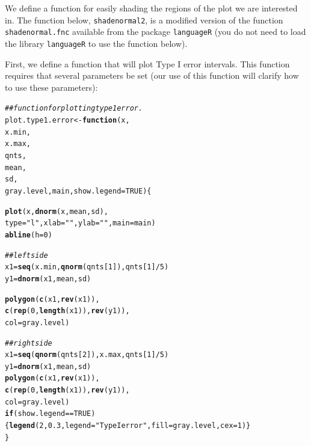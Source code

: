 \documentclass[12pt]{book}\usepackage[]{graphicx}\usepackage[]{color}
\makeatletter
\newcommand{\hlnum}[1]{\textcolor[rgb]{0.686,0.059,0.569}{#1}}%
\newcommand{\hlstr}[1]{\textcolor[rgb]{0.192,0.494,0.8}{#1}}%
\newcommand{\hlcom}[1]{\textcolor[rgb]{0.678,0.584,0.686}{\textit{#1}}}%
\newcommand{\hlopt}[1]{\textcolor[rgb]{0,0,0}{#1}}%
\newcommand{\hlstd}[1]{\textcolor[rgb]{0.345,0.345,0.345}{#1}}%
\newcommand{\hlkwa}[1]{\textcolor[rgb]{0.161,0.373,0.58}{\textbf{#1}}}%
\newcommand{\hlkwb}[1]{\textcolor[rgb]{0.69,0.353,0.396}{#1}}%
\newcommand{\hlkwc}[1]{\textcolor[rgb]{0.333,0.667,0.333}{#1}}%
\newcommand{\hlkwd}[1]{\textcolor[rgb]{0.737,0.353,0.396}{\textbf{#1}}}%
\newenvironment{kframe}{%
 \def\at@end@of@kframe{}%
 \ifinner\ifhmode%
  \def\at@end@of@kframe{\end{minipage}}%
  \begin{minipage}{\columnwidth}%
 \fi\fi%
 \def\FrameCommand##1{\hskip\@totalleftmargin \hskip-\fboxsep
 \colorbox{shadecolor}{##1}\hskip-\fboxsep
     \hskip-\linewidth \hskip-\@totalleftmargin \hskip\columnwidth}%
 \MakeFramed {\advance\hsize-\width
   \@totalleftmargin\z@ \linewidth\hsize
   \@setminipage}}%
 {\par\unskip\endMakeFramed%
 \at@end@of@kframe}
\newenvironment{knitrout}{}{} %
\makeatother
\begin{document}
We define a function for easily shading the regions of the plot we are
interested in. The function below, \texttt{shadenormal2}, is a
modified version of the function \texttt{shadenormal.fnc} available
from the package \texttt{languageR}  (you do not
need to load the library \texttt{languageR} to use the function below). 

First, we define a function that will plot Type I error
intervals. This function requires that several parameters be set (our
use of this function will clarify how to use these parameters):


\begin{knitrout}
\color{fgcolor}\begin{kframe}
\begin{alltt}
\hlcom{## function for plotting type 1 error.}
\hlstd{plot.type1.error}\hlkwb{<-}\hlkwa{function}\hlstd{(}\hlkwc{x}\hlstd{,}
                           \hlkwc{x.min}\hlstd{,}
                           \hlkwc{x.max}\hlstd{,}
                           \hlkwc{qnts}\hlstd{,}
                           \hlkwc{mean}\hlstd{,}
                           \hlkwc{sd}\hlstd{,}
                           \hlkwc{gray.level}\hlstd{,}\hlkwc{main}\hlstd{,}\hlkwc{show.legend}\hlstd{=}\hlnum{TRUE}\hlstd{)\{}

        \hlkwd{plot}\hlstd{(x,}\hlkwd{dnorm}\hlstd{(x,mean,sd),}
                     \hlkwc{type} \hlstd{=} \hlstr{"l"}\hlstd{,}\hlkwc{xlab}\hlstd{=}\hlstr{""}\hlstd{,}\hlkwc{ylab}\hlstd{=}\hlstr{""}\hlstd{,}\hlkwc{main}\hlstd{=main)}
        \hlkwd{abline}\hlstd{(}\hlkwc{h} \hlstd{=} \hlnum{0}\hlstd{)}

\hlcom{## left side    }
    \hlstd{x1} \hlkwb{=} \hlkwd{seq}\hlstd{(x.min,} \hlkwd{qnorm}\hlstd{(qnts[}\hlnum{1}\hlstd{]), qnts[}\hlnum{1}\hlstd{]}\hlopt{/}\hlnum{5}\hlstd{)}
    \hlstd{y1} \hlkwb{=} \hlkwd{dnorm}\hlstd{(x1, mean, sd)}

    \hlkwd{polygon}\hlstd{(}\hlkwd{c}\hlstd{(x1,} \hlkwd{rev}\hlstd{(x1)),}
            \hlkwd{c}\hlstd{(}\hlkwd{rep}\hlstd{(}\hlnum{0}\hlstd{,} \hlkwd{length}\hlstd{(x1)),} \hlkwd{rev}\hlstd{(y1)),}
            \hlkwc{col} \hlstd{= gray.level)}

\hlcom{## right side            }
    \hlstd{x1} \hlkwb{=} \hlkwd{seq}\hlstd{(}\hlkwd{qnorm}\hlstd{(qnts[}\hlnum{2}\hlstd{]), x.max, qnts[}\hlnum{1}\hlstd{]}\hlopt{/}\hlnum{5}\hlstd{)}
    \hlstd{y1} \hlkwb{=} \hlkwd{dnorm}\hlstd{(x1, mean, sd)}
    \hlkwd{polygon}\hlstd{(}\hlkwd{c}\hlstd{(x1,} \hlkwd{rev}\hlstd{(x1)),}
            \hlkwd{c}\hlstd{(}\hlkwd{rep}\hlstd{(}\hlnum{0}\hlstd{,} \hlkwd{length}\hlstd{(x1)),} \hlkwd{rev}\hlstd{(y1)),}
            \hlkwc{col} \hlstd{= gray.level)}
\hlkwa{if}\hlstd{(show.legend}\hlopt{==}\hlnum{TRUE}\hlstd{)\{}\hlkwd{legend}\hlstd{(}\hlnum{2}\hlstd{,}\hlnum{0.3}\hlstd{,} \hlkwc{legend}\hlstd{=}\hlstr{"Type I error"}\hlstd{,}\hlkwc{fill}\hlstd{=gray.level,}\hlkwc{cex}\hlstd{=}\hlnum{1}\hlstd{)\}}
        \hlstd{\}}
\end{alltt}
\end{kframe}
\end{knitrout}
\end{document}
